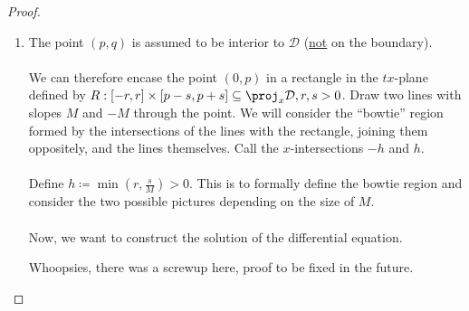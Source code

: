 \documentclass[12pt]{article}
\begin{document}
\begin{proof}
\begin{enumerate}
\item The point $(p,q)$ is assumed to be interior to $\mathcal{D}$ (\underline{not} on the boundary). \\ \\
We can therefore encase the point $(0,p)$ in a rectangle in the $tx$-plane defined by $R:[-r,r] \times [p-s,p+s] \subseteq \proj_{x}\mathcal{D}, r,s > 0$. Draw two lines with slopes $M$ and $-M$ through the point. We will consider the ``bowtie'' region formed by the intersections of the lines with the rectangle, joining them oppositely, and the lines themselves. Call the $x$-intersections $-h$ and $h$. \\ \\
Define $h \coloneqq \min\left(r,\frac{s}{M}\right) > 0$. This is to formally define the bowtie region and consider the two possible pictures depending on the size of $M$. \\ \\
Now, we want to construct the solution of the differential equation.

Whoopsies, there was a screwup here, proof to be fixed in the future.
\begin{figure}[h!]
  \centering
\end{figure}

\end{enumerate}

\end{proof}
\end{document}
